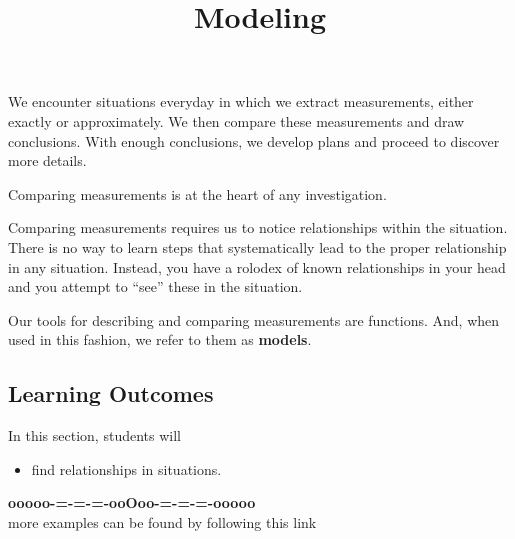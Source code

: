 \documentclass{ximera}
\title{Modeling}
\begin{document}
\begin{abstract}
\end{abstract}
\maketitle





We encounter situations everyday in which we extract measurements, either exactly or approximately. We then compare these measurements and draw conclusions.  With enough conclusions, we develop plans and proceed to discover more details.


Comparing measurements is at the heart of any investigation.

Comparing measurements requires us to notice relationships within the situation.  There is no way to learn steps that systematically lead to the proper relationship in any situation.  Instead, you have a rolodex of known relationships in your head and you attempt to ``see'' these in the situation.



Our tools for describing and comparing measurements are functions.  And, when used in this fashion, we refer to them as \textbf{models}.

























\subsection*{Learning Outcomes}


\begin{sectionOutcomes}
In this section, students will 

\begin{itemize}
\item find relationships in situations.
\end{itemize}
\end{sectionOutcomes}














\begin{center}
\textbf{\textcolor{green!50!black}{ooooo-=-=-=-ooOoo-=-=-=-ooooo}} \\

more examples can be found by following this link\\ 

\end{center}
\end{document}
